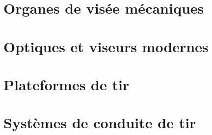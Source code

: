     \chapter{Organes de visée mécaniques}
    \label{chap:organes_visee_mecaniques}
    

    \chapter{Optiques et viseurs modernes}
    \label{chap:optiques_et_viseurs_modernes}
    

    \chapter{Plateformes de tir}
    \label{chap:plateformes_de_tir}
    

    \chapter{Systèmes de conduite de tir}
    \label{chap:systemes_conduite_tir}
    


